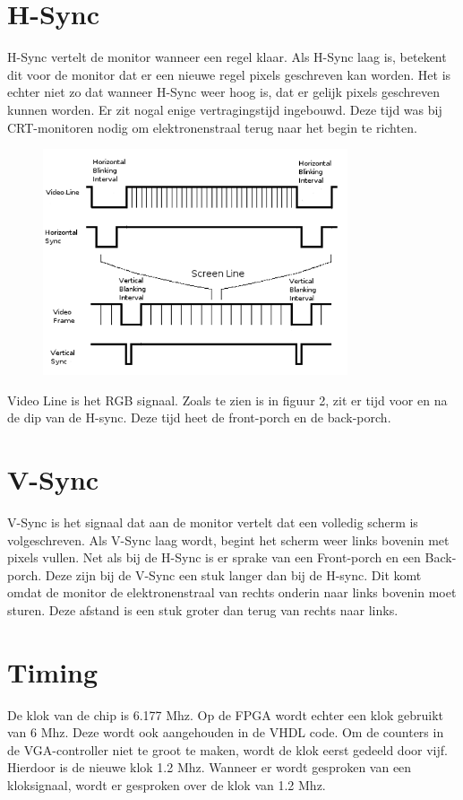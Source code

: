 \documentclass[oneside,dutch]{tudelft-report}
\begin{document}
\section{H-Sync}
H-Sync vertelt de monitor wanneer een regel klaar. Als H-Sync laag is, betekent dit voor de monitor dat er een nieuwe regel pixels geschreven kan worden. Het is echter niet zo dat wanneer H-Sync weer hoog is, dat er gelijk pixels geschreven kunnen worden. Er zit nogal enige vertragingstijd ingebouwd. Deze tijd was bij CRT-monitoren nodig om elektronenstraal terug naar het begin te richten.

\begin{figure}[H]
\center
\includegraphics[width=9cm]{VGA_signal_format}
\caption{}
\label{VGA}
\end{figure}

Video Line is het RGB signaal. Zoals te zien is in figuur 2, zit er tijd voor en na de dip van de H-sync. Deze tijd heet de front-porch en de back-porch. 

\section{V-Sync}
V-Sync is het signaal dat aan de monitor vertelt dat een volledig scherm is volgeschreven. Als V-Sync laag wordt, begint het scherm weer links bovenin met pixels vullen. Net als bij de H-Sync is er sprake van een Front-porch en een Back-porch. Deze zijn bij de V-Sync een stuk langer dan bij de H-sync. Dit komt omdat de monitor de elektronenstraal van rechts onderin naar links bovenin moet sturen. Deze afstand is een stuk groter dan terug van rechts naar links. 

\section{Timing}
De klok van de chip is 6.177 Mhz. Op de FPGA wordt echter een klok gebruikt van 6 Mhz. Deze wordt ook aangehouden in de VHDL code. Om de counters in de VGA-controller niet te groot te maken, wordt de klok eerst gedeeld door vijf. Hierdoor is de nieuwe klok 1.2 Mhz. Wanneer er wordt gesproken van een kloksignaal, wordt er gesproken over de klok van 1.2 Mhz.
\end{document}
